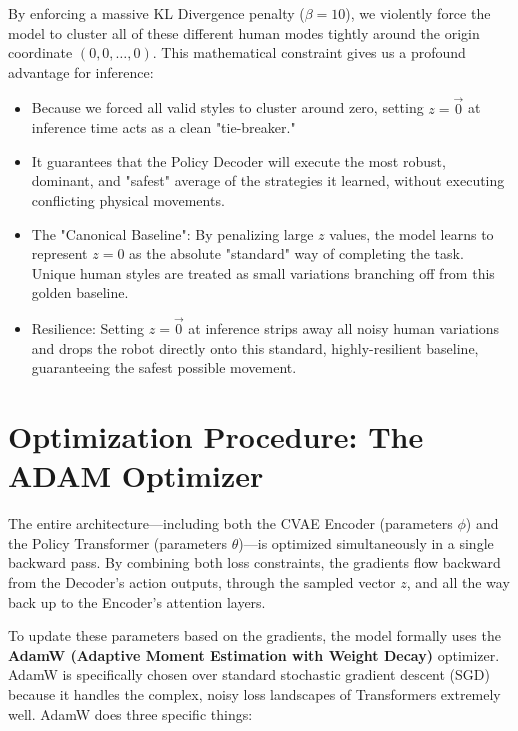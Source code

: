 \documentclass[11pt,a4paper]{article}
\begin{document}
By enforcing a massive KL Divergence penalty ($\beta=10$), we violently force the model to cluster all of these different human modes tightly around the origin coordinate $(0,0,\dots,0)$. This mathematical constraint gives us a profound advantage for inference:
\begin{itemize}
    \item Because we forced all valid styles to cluster around zero, setting $z=\vec{0}$ at inference time acts as a clean "tie-breaker."
    \item It guarantees that the Policy Decoder will execute the most robust, dominant, and "safest" average of the strategies it learned, without executing conflicting physical movements. 
    \item The "Canonical Baseline": By penalizing large $z$ values, the model learns to represent $z=0$ as the absolute "standard" way of completing the task. Unique human styles are treated as small variations branching off from this golden baseline.
    \item Resilience: Setting $z=\vec{0}$ at inference strips away all noisy human variations and drops the robot directly onto this standard, highly-resilient baseline, guaranteeing the safest possible movement.
\end{itemize}

\section{Optimization Procedure: The ADAM Optimizer}
The entire architecture—including both the CVAE Encoder (parameters $\phi$) and the Policy Transformer (parameters $\theta$)—is optimized simultaneously in a single backward pass. By combining both loss constraints, the gradients flow backward from the Decoder's action outputs, through the sampled vector $z$, and all the way back up to the Encoder's attention layers.

To update these parameters based on the gradients, the model formally uses the \textbf{AdamW (Adaptive Moment Estimation with Weight Decay)} optimizer. AdamW is specifically chosen over standard stochastic gradient descent (SGD) because it handles the complex, noisy loss landscapes of Transformers extremely well. AdamW does three specific things:
\end{document}
